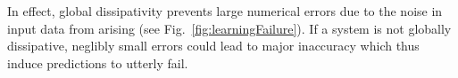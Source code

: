 In effect, global dissipativity prevents large numerical errors due to the noise in input data from arising (see Fig.~\ref{fig:learningFailure}). 
If a system is not globally dissipative, neglibly small errors could lead to major inaccuracy which thus induce predictions to utterly fail.


